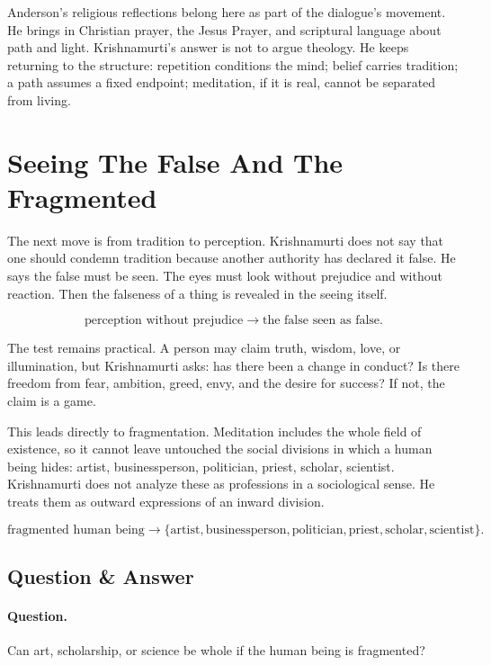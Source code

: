 Anderson's religious reflections belong here as part of the dialogue's movement. He brings in Christian prayer, the Jesus Prayer, and scriptural language about path and light. Krishnamurti's answer is not to argue theology. He keeps returning to the structure: repetition conditions the mind; belief carries tradition; a path assumes a fixed endpoint; meditation, if it is real, cannot be separated from living.

\section{Seeing The False And The Fragmented}

The next move is from tradition to perception. Krishnamurti does not say that one should condemn tradition because another authority has declared it false. He says the false must be seen. The eyes must look without prejudice and without reaction. Then the falseness of a thing is revealed in the seeing itself.

\begin{equation}
\text{perception without prejudice}
\longrightarrow
\text{the false seen as false}.
\end{equation}

The test remains practical. A person may claim truth, wisdom, love, or illumination, but Krishnamurti asks: has there been a change in conduct? Is there freedom from fear, ambition, greed, envy, and the desire for success? If not, the claim is a game.

This leads directly to fragmentation. Meditation includes the whole field of existence, so it cannot leave untouched the social divisions in which a human being hides: artist, businessperson, politician, priest, scholar, scientist. Krishnamurti does not analyze these as professions in a sociological sense. He treats them as outward expressions of an inward division.

\begin{equation}
\text{fragmented human being}
\longrightarrow
\{\text{artist}, \text{businessperson}, \text{politician},
\text{priest}, \text{scholar}, \text{scientist}\}.
\end{equation}

\subsection{Question \& Answer}

\paragraph{Question.}
Can art, scholarship, or science be whole if the human being is fragmented?

